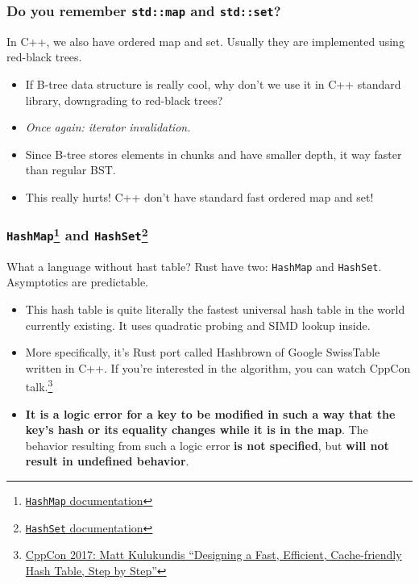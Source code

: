 \documentclass[aspectratio=1610,t]{beamer}
\begin{document}
\begin{frame}[fragile]
\frametitle{Do you remember \texttt{std::map} and \texttt{std::set}?}
In C++, we also have ordered map and set. Usually they are implemented using red-black trees.

\begin{itemize}
    \item<2-> If B-tree data structure is really cool, why don't we use it in C++ standard library, downgrading to red-black trees?
    \item<3-> \textit{Once again: iterator invalidation.}
    \item<4-> Since B-tree stores elements in chunks and have smaller depth, it way faster than regular BST.
    \item<5-> This really hurts! C++ don't have standard fast ordered map and set!
\end{itemize}
\end{frame}


\begin{frame}[fragile]
\frametitle{\texttt{HashMap}\footnote{\href{https://doc.rust-lang.org/std/collections/struct.HashMap.html}{\texttt{HashMap} documentation}} and \texttt{HashSet}\footnote{\href{https://doc.rust-lang.org/std/collections/struct.HashSet.html}{\texttt{HashSet} documentation}}}
What a language without hast table? Rust have two: \texttt{HashMap} and \texttt{HashSet}. Asymptotics are predictable.

\begin{itemize}
    \item<2-> This hash table is quite literally the fastest universal hash table in the world currently existing. It uses quadratic probing and SIMD lookup inside.
    \item<3-> More specifically, it's Rust port called Hashbrown of Google SwissTable written in C++. If you're interested in the algorithm, you can watch CppCon talk.\footnote{\href{https://www.youtube.com/watch?v=ncHmEUmJZf4}{CppCon 2017: Matt Kulukundis ``Designing a Fast, Efficient, Cache-friendly Hash Table, Step by Step''}}
    \item<4-> \textbf{It is a logic error for a key to be modified in such a way that the key's hash or its equality changes while it is in the map}. The behavior resulting from such a logic error \textbf{is not specified}, but \textbf{will not result in undefined behavior}.
\end{itemize}
\end{frame}
\end{document}
